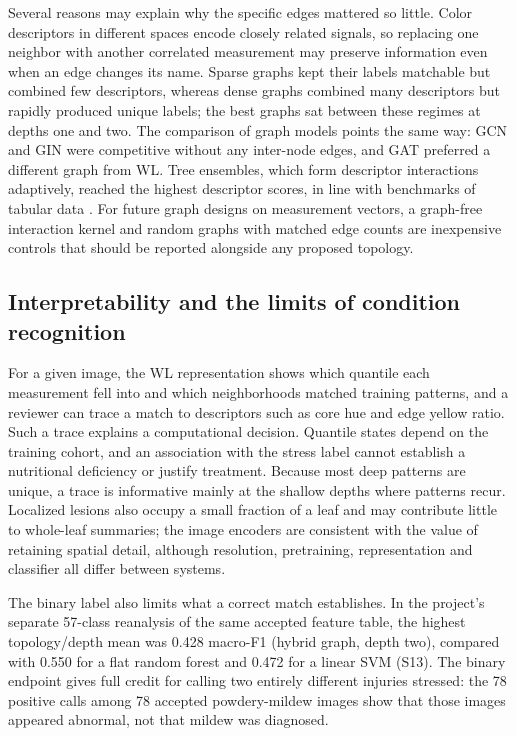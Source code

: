 Several reasons may explain why the specific edges mattered so little. Color descriptors in different spaces encode closely related signals, so replacing one neighbor with another correlated measurement may preserve information even when an edge changes its name. Sparse graphs kept their labels matchable but combined few descriptors, whereas dense graphs combined many descriptors but rapidly produced unique labels; the best graphs sat between these regimes at depths one and two. The comparison of graph models points the same way: GCN and GIN were competitive without any inter-node edges, and GAT preferred a different graph from WL. Tree ensembles, which form descriptor interactions adaptively, reached the highest descriptor scores, in line with benchmarks of tabular data \citep{Grinsztajn2022,ShwartzZiv2022}. For future graph designs on measurement vectors, a graph-free interaction kernel and random graphs with matched edge counts are inexpensive controls that should be reported alongside any proposed topology.

\subsection{Interpretability and the limits of condition recognition}
For a given image, the WL representation shows which quantile each measurement fell into and which neighborhoods matched training patterns, and a reviewer can trace a match to descriptors such as core hue and edge yellow ratio. Such a trace explains a computational decision. Quantile states depend on the training cohort, and an association with the stress label cannot establish a nutritional deficiency or justify treatment. Because most deep patterns are unique, a trace is informative mainly at the shallow depths where patterns recur. Localized lesions also occupy a small fraction of a leaf and may contribute little to whole-leaf summaries; the image encoders are consistent with the value of retaining spatial detail, although resolution, pretraining, representation and classifier all differ between systems.

The binary label also limits what a correct match establishes. In the project's separate 57-class reanalysis of the same accepted feature table, the highest topology/depth mean was 0.428 macro-F1 (hybrid graph, depth two), compared with 0.550 for a flat random forest and 0.472 for a linear SVM (S13). The binary endpoint gives full credit for calling two entirely different injuries stressed: the 78 positive calls among 78 accepted powdery-mildew images show that those images appeared abnormal, not that mildew was diagnosed.

